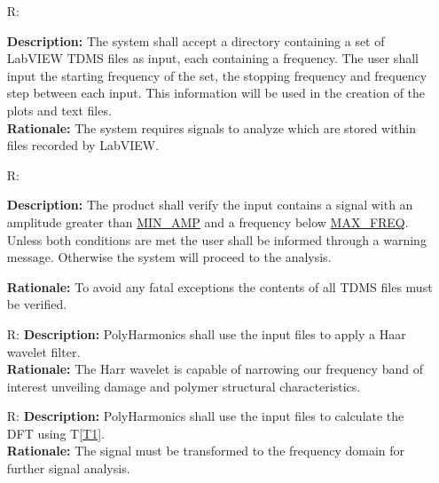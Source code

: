 \documentclass[12pt]{article}
\newcounter{reqnum} %
\newcommand{\progname}{PolyHarmonics}
\begin{document}
\noindent \begin{itemize}

\item[R\refstepcounter{reqnum}\thereqnum \label{R_Input}:] 

\textbf{Description:} The system shall accept a directory containing a set of 
LabVIEW TDMS files as
input, each containing a frequency. The user shall input the starting
 frequency of the set, the stopping frequency and frequency step between each 
 input. This information will be used in the creation of the plots and 
 text files.\\
\textbf{Rationale:} The system requires signals to analyze which are stored
within files recorded by LabVIEW.\\


\item[R\refstepcounter{reqnum}\thereqnum \label{R_Verify}:] 

\textbf{Description:} The product shall verify the input contains a signal
 with an amplitude greater than \hyperref[AppendA]{MIN\_AMP} and a frequency
  below \hyperref[AppendA]{MAX\_FREQ}. Unless both conditions are met 
  the user shall be informed through a warning message. Otherwise the system will 
proceed to the analysis.

\textbf{Rationale:} To avoid any fatal exceptions the contents of all TDMS 
files must be verified.


\item[R\refstepcounter{reqnum}\thereqnum \label{R_Filter}:] 
\textbf{Description:} \progname{} shall use the input files to apply a Haar 
wavelet filter. \cite{WaveletIntro} \cite{WaveletGuide}\\ 
\textbf{Rationale:} The Harr wavelet is capable of narrowing our frequency band of 
interest unveiling damage and polymer structural characteristics. 

\item[R\refstepcounter{reqnum}\thereqnum \label{R_Tranform}:] 
\textbf{Description:} \progname{} shall use the input files to calculate the DFT
using T\ref{T1}.\\
\textbf{Rationale:} The signal must be transformed to the frequency domain
for further signal analysis.\newline


\end{itemize}
\end{document}
